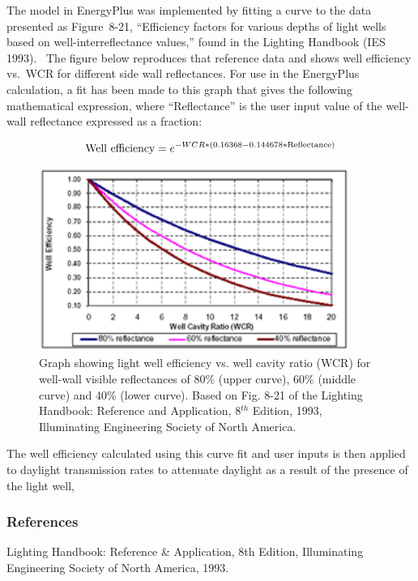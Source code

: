 The model in EnergyPlus was implemented by fitting a curve to the data presented as Figure~8-21, ``Efficiency factors for various depths of light wells based on well-interreflectance values,'' found in the Lighting Handbook (IES 1993).~ The figure below reproduces that reference data and shows well efficiency vs.~WCR for different side wall reflectances. For use in the EnergyPlus calculation, a fit has been made to this graph that gives the following mathematical expression, where ``Reflectance'' is the user input value of the well-wall reflectance expressed as a fraction:

\begin{equation}
{\rm{Well~efficiency}} = {e^{ - WCR*(0.16368 - 0.144678*{\rm{Reflectance}})}}
\end{equation}

\begin{figure}[hbtp] %
\centering
\includegraphics[width=0.9\textwidth, height=0.9\textheight, keepaspectratio=true]{media/image910.png}
\caption{Graph showing light well efficiency vs. well cavity ratio (WCR) for well-wall visible reflectances of 80\% (upper curve), 60\% (middle curve) and 40\% (lower curve). Based on Fig. 8-21 of the Lighting Handbook: Reference and Application, 8\(^{th}\) Edition, 1993, Illuminating Engineering Society of North America. \protect \label{fig:graph-showing-light-well-efficiency-vs.-well}}
\end{figure}

The well efficiency calculated using this curve fit and user inputs is then applied to daylight transmission rates to attenuate daylight as a result of the presence of the light well,

\subsubsection{References}\label{references-2-004}

Lighting Handbook: Reference \& Application, 8th Edition, Illuminating Engineering Society of North America, 1993.
